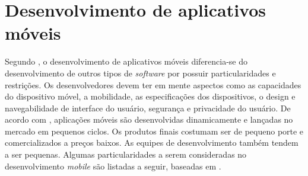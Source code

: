 \chapter{Desenvolvimento de aplicativos móveis} \label{cap:referencialteorico} 

Segundo , o desenvolvimento de aplicativos móveis diferencia-se do desenvolvimento de outros tipos de \textit{software} por possuir particularidades e restrições. Os desenvolvedores devem ter em mente aspectos como as capacidades do dispositivo móvel, a mobilidade, as especificações dos dispositivos, o design e navegabilidade de interface do usuário, segurança e privacidade do usuário.
 De acordo com , aplicações móveis  são desenvolvidas dinamicamente e lançadas no mercado em pequenos ciclos. Os produtos finais costumam ser de pequeno porte e comercializados a preços baixos. As equipes de desenvolvimento também tendem a ser pequenas.
Algumas particularidades a serem consideradas no desenvolvimento \textit{mobile} são listadas a seguir, baseadas em .

